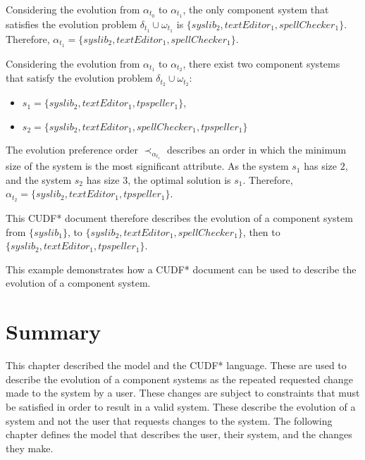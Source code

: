 Considering the evolution from $\alpha_{t_0}$ to $\alpha_{t_1}$,
the only component system that satisfies the evolution problem $\delta_{t_1} \cup \omega_{t_1}$
is $\{syslib_2, textEditor_1, spellChecker_1\}$.
Therefore, $\alpha_{t_1} = \{syslib_2, textEditor_1, spellChecker_1\}$.

Considering the evolution from $\alpha_{t_1}$ to $\alpha_{t_2}$,
there exist two component systems that satisfy the evolution problem $\delta_{t_2} \cup \omega_{t_2}$:
\begin{itemize}
  \item $s_1 = \{syslib_2, textEditor_1, tpspeller_1\}$,
  \item $s_2 = \{syslib_2, textEditor_1, spellChecker_1, tpspeller_1\}$
\end{itemize}

The evolution preference order $\prec_{\alpha_{t_1}}$ describes an order in which the minimum size of the system is the most significant attribute.
As the system $s_1$ has size $2$, and the system $s_2$ has size $3$, the optimal solution is $s_1$.
Therefore, $\alpha_{t_2} = \{syslib_2, textEditor_1, tpspeller_1\}$.

This CUDF* document therefore describes the evolution of a component system from 
$\{syslib_1\}$, to $\{syslib_2, textEditor_1, spellChecker_1\}$, then to $\{syslib_2, textEditor_1, tpspeller_1\}$.

This example demonstrates how a CUDF* document can be used to describe the evolution of a component system. 

\section{Summary}
This chapter described the \modelname model and the CUDF* language. 
These are used to describe the evolution of a component systems as the repeated requested change made to the system by a user.
These changes are subject to constraints that must be satisfied in order to result in a valid system.
These describe the evolution of a system and not the user that requests changes to the system.
The following chapter defines the \usermodel model that describes the user, their system, and the changes they make.

